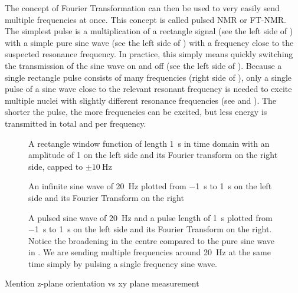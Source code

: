 The concept of Fourier Transformation can then be used to very easily send multiple frequencies at once. This concept is called pulsed NMR or FT-NMR. The simplest pulse is a multiplication of a rectangle signal (see the left side of ) with a simple pure sine wave (see the left side of ) with a frequency close to the suspected resonance frequency. In practice, this simply means quickly switching the transmission of the sine wave on and off (see the left side of ). Because a single rectangle pulse consists of many frequencies (right side of ), only a single pulse of a sine wave close to the relevant resonant frequency is needed to excite multiple nuclei with slightly different resonance frequencies (see  and ). The shorter the pulse, the more frequencies can be excited, but less energy is transmitted in total and per frequency.
\begin{figure}[tbh]
    
    \caption{A rectangle window function of length \qty{1}{\second} in time domain with an amplitude of 1 on the left side and its Fourier transform on the right side, capped to \(\pm{}\qty{10}{\hertz}\)}
\end{figure}

\begin{figure}[tbh]
    
    \caption{An infinite sine wave of \qty{20}{\hertz} plotted from \qty{-1}{\second} to \qty{1}{\second} on the left side and its Fourier Transform on the right}
\end{figure}

\begin{figure}[tbh]
    
    \caption{A pulsed sine wave of \qty{20}{\hertz} and a pulse length of \qty{1}{\second} plotted from \qty{-1}{\second} to \qty{1}{\second} on the left side and its Fourier Transform on the right. Notice the broadening in the centre compared to the pure sine wave in . We are sending multiple frequencies around \qty{20}{\hertz} at the same time simply by pulsing a single frequency sine wave.}
\end{figure}

Mention z-plane orientation vs xy plane measurement
